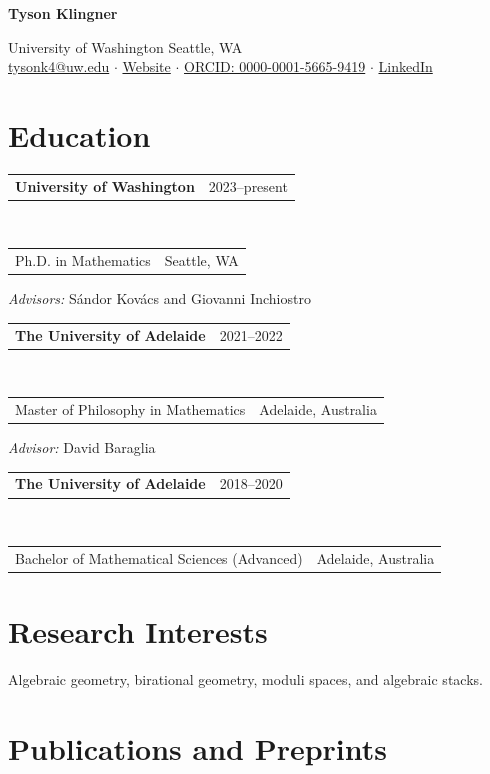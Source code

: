 \documentclass[11pt]{article}
\makeatletter
\newcommand{\cvitem}[2]{%
  \noindent
  \begin{tabularx}{\textwidth}{@{}Xr@{}}
    #1 & #2
  \end{tabularx}
}
\newcommand{\cventry}[4]{%
  \cvitem{\textbf{#1}}{#2}\\[-1pt]
  \cvitem{#3}{#4}
  \vspace{5pt}
}
\makeatother
\begin{document}

{\LARGE\bfseries Tyson Klingner}

\vspace{4pt}

University of Washington \hfill Seattle, WA\\
\href{mailto:tysonk4@uw.edu}{tysonk4@uw.edu}
\quad $\cdot$ \quad
\href{https://tysonklingner.github.io/}{Website}
\quad $\cdot$ \quad
\href{https://orcid.org/0000-0001-5665-9419}{ORCID: 0000-0001-5665-9419}
\quad $\cdot$ \quad
\href{https://www.linkedin.com/in/tyson-klingner/}{LinkedIn}

\section{Education}

\cventry
  {University of Washington}
  {2023--present}
  {Ph.D. in Mathematics}
  {Seattle, WA}

\textit{Advisors:} S\'andor Kov\'acs and Giovanni Inchiostro

\vspace{6pt}

\cventry
  {The University of Adelaide}
  {2021--2022}
  {Master of Philosophy in Mathematics}
  {Adelaide, Australia}

\textit{Advisor:} David Baraglia

\vspace{6pt}

\cventry
  {The University of Adelaide}
  {2018--2020}
  {Bachelor of Mathematical Sciences (Advanced)}
  {Adelaide, Australia}


\section{Research Interests}

Algebraic geometry, birational geometry, moduli spaces, and algebraic stacks.

\section{Publications and Preprints}
\end{document}
